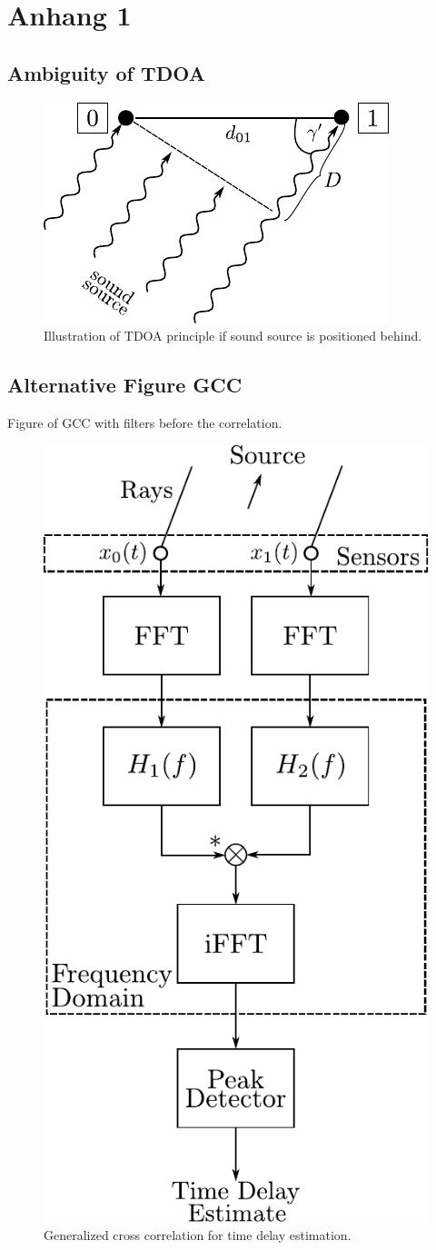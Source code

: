 \chapter{Anhang 1}
\label{chap:appendix1}

\section{Ambiguity of \ac{TDOA}}
\label{appendix:a1_tdoaRear}
\begin{figure}[ht]
	\centering
		\includegraphics[width=0.4\columnwidth]{figures/tdoa_waves_rear}
	\caption{Illustration of \ac{TDOA} principle if sound source is positioned behind.}
	\label{fig:ap1_tdoaRear}
\end{figure}

\section{Alternative Figure GCC}
\label{appendix:a1_alternativeGcc}

Figure of \ac{GCC} with filters before the correlation.
\begin{figure}[ht]
	\centering
		\includegraphics[width=0.35\columnwidth]{figures/GCC}
	\caption{Generalized cross correlation for time delay estimation.}
	\label{fig:ap1_GCC}
\end{figure}

